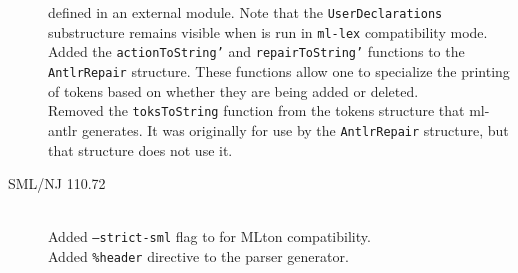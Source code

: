\begin{description}
    defined in an external module.  Note that the \texttt{UserDeclarations} substructure remains
    visible when \ulex{} is run in \texttt{ml-lex} compatibility mode.
    \\[0.5em]
    Added the \texttt{actionToString'} and \texttt{repairToString'} functions
    to the \texttt{AntlrRepair} structure.  These functions allow one to
    specialize the printing of tokens based on whether they are being added or deleted.
    \\[0.5em]
    Removed the \texttt{toksToString} function from the tokens structure that ml-antlr
    generates.  It was originally for use by the \texttt{AntlrRepair} structure, but that
    structure does not use it.
    \pagebreak
%
  \item[SML/NJ 110.72]
    \mbox{}\\[0.5em]
    Added \texttt{--strict-sml} flag to \ulex{} for MLton compatibility.
    \\[0.5em]
    Added \texttt{\%header} directive to the \mlantlr{} parser generator.
\end{description}%
